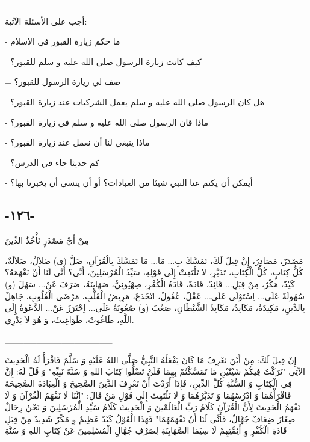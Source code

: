 \documentclass[a5paper]{article}
\begin{document}
\_\_\_\_\_\_\_\_\_\_\_\_

أجب على الأسئلة الآتية:

- ما حكم زيارة القبور في الإسلام

- كيف كانت زيارة الرسول صلى الله عليه و سلم للقبور؟ 

= صف لي زيارة الرسول للقبور؟

- هل كان الرسول صلى الله عليه و سلم يعمل الشركيات عند زيارة القبور؟

- ماذا قان الرسول صلى الله عليه و سلم في زيارة القبور؟

- ماذا ينبغي لنا أن نعمل عند زيارة القبور؟

- كم حديثا جاء في الدرس؟

- أيمكن أن يكتم عنا النبي شيئا من العبادات؟ أو أن ينسى أن يخبرنا بها؟

\subsection{-١٢٦-}
مِنْ أَيِّ مَصْدَرٍ نَأْخُذُ الدِّينَ

مَصْدَرٌ، مَصَادِرُ، إِنْ قِيلَ لَكَ، تَمَسَّكَ بِ... مَا... مَا تَمَسَّكَ بِالْقُرْآنِ، ضَلَّ (ى) ضَلاَلٌ، ضَلاَلَةٌ، كُلُّ كِتَابٍ، كُلُّ الْكِتَابِ، تَدَبَّرِ، لا تَلْتَفِتْ إِلَى قَوْلِهِ، سَيِّدُ الْمُرْسَلِينَ، أَنَّى؟ أَنَّى لَنَا أَنْ نَفْهَمَهُ؟ كَيْدٌ، مَكْرٌ، مِنْ قِبَلِ... قَائِدٌ، قَادَةٌ، قَادَةُ الْكُفْرِ، صِهْيُونِيٌّ، صَهَايِنَةٌ، صَرَفَ عَنْ... سَهُلَ (و) سُهُولَةٌ عَلَى... اِسْتَوْلَى عَلَى... عَقْلٌ، عُقُولٌ، انْخَدَعَ، مَرِيضُ الْقَلْبِ، مَرْضَى الْقُلُوبِ، جَاهِلٌ بِالدِّينِ، مَكِيدَةٌ، مَكَايِدُ، مَكَايِدُ الشَّيْطَانِ، صَعُبَ (و) صُعُوبَةٌ عَلَى... اِحْتَرَزَ عَنْ... الدَّعْوَةُ إِلَى اللَّهِ، طَاغُوتٌ، طَوَاغِيتُ، وَ هُوَ لاَ يَدْرِي.

\_\_\_\_\_\_\_\_\_\_\_\_\_\_\_\_\_

إِنْ قِيلَ لَكَ: مِنْ أَيْنَ نَعْرِفُ مَا كَانَ يَفْعَلُهُ النَّبِيُّ صَلَّى اللهُ عَلَيْهِ وَ سَلَّمَ فَاقْرَأْ لَهُ الْحَدِيثَ الآتِي "تَرَكْتُ فِيكُمْ شَيْئَيْنِ مَا تَمَسَّكْتُمْ بِهِمَا فَلَنْ تَضْلُّوا كِتَابَ اللهِ وَ سُنَّةَ نَبِيِّهِ" وَ قُلْ لَهُ: إِنَّ فِي الْكِتَابِ وَ السُّنَّةِ كُلَّ الدِّينِ، فَإِذَا أَرَدْتَ أَنْ تَعْرِفَ الدَّينَ الصَّحِيحَ وَ الْعِبَادَةَ الصَّحِيحَةَ فَاقْرَأْهُمَا وَ ادْرُسَْهُمَا وَ تَدَبَّرْهُمَا وَ لَا تَلْتَفِتْ إِلَى فَوْلِ مَنْ قَالَ: "إِنَّنَا لَا نَفْهَمُ الْقُرْآنَ وَ لَا نَفْهَمُ الْحَدِيثَ لِأَنَّ الْقُرْآنَ كَلَامُ رَبِّ الْعَالَمْينَ وَ الْحَدِيثَ كَلَامُ سَيِّدِ الْمُرْسَلِينَ وَ نَحْنُ رِجَالٌ صِغَارٌ ضِعَافٌ جُهَّالٌ، فَأَنَّى لَنَا أَنْ نَفْهَمَهُمَا" فَهَذَا الْقَوْلُ كَيْدٌ عَظِيمٌ وِ مَكْرٌ شَدِيدٌ مِنْ قِبَلِ قَادَةِ الْكُفْرِ وِ أَئِمَّتِهِمْ لَا سِيَمَا الصَّهَايِنَةِ لِصَرْفِ جُهَّالِ الْمُسْلِمِينَ عَنْ كِتَابِ اللهِ وَ سُنَّةِ
\end{document}
